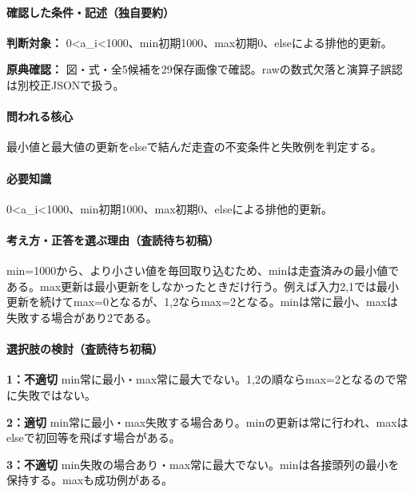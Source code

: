\paragraph{確認した条件・記述（独自要約）}\mbox{}\par

\noindent\textbf{判断対象：} 0<a\_i<1000、min初期1000、max初期0、elseによる排他的更新。\par

\noindent\textbf{原典確認：} 図・式・全5候補を29保存画像で確認。rawの数式欠落と演算子誤認は別校正JSONで扱う。\par

\paragraph{問われる核心} 最小値と最大値の更新をelseで結んだ走査の不変条件と失敗例を判定する。

\paragraph{必要知識} 0<a\_i<1000、min初期1000、max初期0、elseによる排他的更新。

\paragraph{考え方・正答を選ぶ理由（査読待ち初稿）} min=\allowbreak{}1000から、より小さい値を毎回取り込むため、minは走査済みの最小値である。max更新は最小更新をしなかったときだけ行う。例えば入力2,1では最小更新を続けてmax=\allowbreak{}0となるが、1,2ならmax=\allowbreak{}2となる。minは常に最小、maxは失敗する場合があり2である。

\paragraph{選択肢の検討（査読待ち初稿）}\mbox{}\par

\noindent\textbf{1：不適切} min常に最小・max常に最大でない。1,2の順ならmax=\allowbreak{}2となるので常に失敗ではない。\par

\noindent\textbf{2：適切} min常に最小・max失敗する場合あり。minの更新は常に行われ、maxはelseで初回等を飛ばす場合がある。\par

\noindent\textbf{3：不適切} min失敗の場合あり・max常に最大でない。minは各接頭列の最小を保持する。maxも成功例がある。\par

